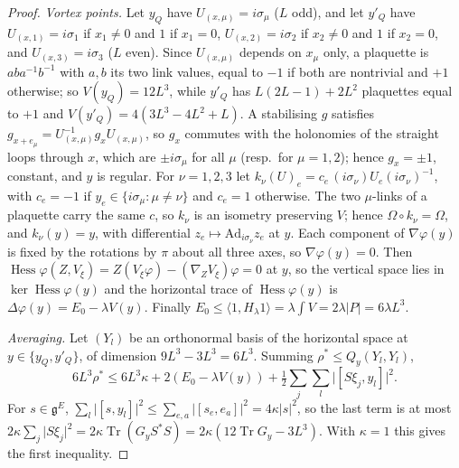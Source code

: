\documentclass[11pt,a4paper]{amsart}
\theoremstyle{definition}
\theoremstyle{remark}
\numberwithin{equation}{section}
\DeclareMathOperator{\Tr}{Tr}        %
\DeclareMathOperator{\Hess}{Hess}    %
\newcommand{\ip}[2]{\langle #1,#2\rangle}  %
\newcommand{\abs}[1]{\lvert #1\rvert}      %
\begin{document}
\begin{proof}
\emph{Vortex points.} Let $y_Q$ have $U_{(x,\mu)}=i\sigma_\mu$ ($L$ odd), and let $y'_Q$ have $U_{(x,1)}=i\sigma_1$ if $x_1\ne0$ and $1$ if $x_1=0$, $U_{(x,2)}=i\sigma_2$ if $x_2\ne0$ and $1$ if $x_2=0$, and $U_{(x,3)}=i\sigma_3$ ($L$ even). Since $U_{(x,\mu)}$ depends on $x_\mu$ only, a plaquette is $aba^{-1}b^{-1}$ with $a,b$ its two link values, equal to $-1$ if both are nontrivial and $+1$ otherwise; so $V(y_Q)=12L^3$, while $y'_Q$ has $L(2L-1)+2L^2$ plaquettes equal to $+1$ and $V(y'_Q)=4(3L^3-4L^2+L)$. A stabilising $g$ satisfies $g_{x+e_\mu}=U_{(x,\mu)}^{-1}g_xU_{(x,\mu)}$, so $g_x$ commutes with the holonomies of the straight loops through $x$, which are $\pm i\sigma_\mu$ for all $\mu$ (resp.\ for $\mu=1,2$); hence $g_x=\pm1$, constant, and $y$ is regular. For $\nu=1,2,3$ let $k_\nu(U)_e=c_e\,(i\sigma_\nu)U_e(i\sigma_\nu)^{-1}$, with $c_e=-1$ if $y_e\in\{i\sigma_\mu:\mu\ne\nu\}$ and $c_e=1$ otherwise. The two $\mu$-links of a plaquette carry the same $c$, so $k_\nu$ is an isometry preserving $V$; hence $\Omega\circ k_\nu=\Omega$, and $k_\nu(y)=y$, with differential $z_e\mapsto\mathrm{Ad}_{i\sigma_\nu}z_e$ at $y$. Each component of $\nabla\varphi(y)$ is fixed by the rotations by $\pi$ about all three axes, so $\nabla\varphi(y)=0$. Then $\Hess\varphi(Z,V_\xi)=Z(V_\xi\varphi)-(\nabla_ZV_\xi)\varphi=0$ at $y$, so the vertical space lies in $\ker\Hess\varphi(y)$ and the horizontal trace of $\Hess\varphi(y)$ is $\Delta\varphi(y)=E_0-\lambda V(y)$. Finally $E_0\le\ip1{H_\lambda1}=\lambda\int V=2\lambda\abs P=6\lambda L^3$.

\emph{Averaging.} Let $(Y_l)$ be an orthonormal basis of the horizontal space at $y\in\{y_Q,y'_Q\}$, of dimension $9L^3-3L^3=6L^3$. Summing $\rho^*\le Q_y(Y_l,Y_l)$,
\[
6L^3\rho^*\le6L^3\kappa+2(E_0-\lambda V(y))+\tfrac12\sum_j\sum_l\abs{[S\xi_j,y_l]}^2 .
\]
For $s\in\mathfrak g^E$, $\sum_l\abs{[s,y_l]}^2\le\sum_{e,a}\abs{[s_e,e_a]}^2=4\kappa\abs s^2$, so the last term is at most $2\kappa\sum_j\abs{S\xi_j}^2=2\kappa\Tr(G_yS^*S)=2\kappa(12\Tr G_y-3L^3)$. With $\kappa=1$ this gives the first inequality.


\end{proof}
\end{document}
